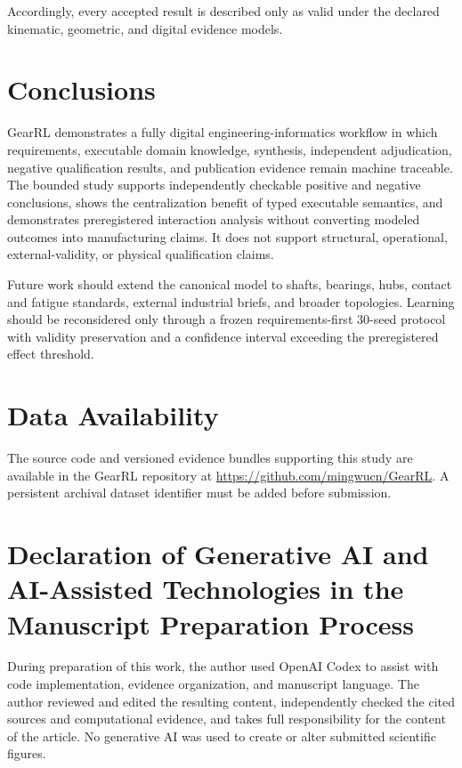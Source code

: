 \documentclass[preprint,12pt]{elsarticle}
\begin{document}
Accordingly, every accepted result is described only as valid under the declared kinematic, geometric, and digital evidence models.

\section{Conclusions}
GearRL demonstrates a fully digital engineering-informatics workflow in which requirements, executable domain knowledge, synthesis, independent adjudication, negative qualification results, and publication evidence remain machine traceable. The bounded study supports independently checkable positive and negative conclusions, shows the centralization benefit of typed executable semantics, and demonstrates preregistered interaction analysis without converting modeled outcomes into manufacturing claims. It does not support structural, operational, external-validity, or physical qualification claims.

Future work should extend the canonical model to shafts, bearings, hubs, contact and fatigue standards, external industrial briefs, and broader topologies. Learning should be reconsidered only through a frozen requirements-first 30-seed protocol with validity preservation and a confidence interval exceeding the preregistered effect threshold.

\section{Data Availability}
The source code and versioned evidence bundles supporting this study are available in the GearRL repository at \url{https://github.com/mingwucn/GearRL}. A persistent archival dataset identifier must be added before submission.

\section{Declaration of Generative AI and AI-Assisted Technologies in the Manuscript Preparation Process}
During preparation of this work, the author used OpenAI Codex to assist with code implementation, evidence organization, and manuscript language. The author reviewed and edited the resulting content, independently checked the cited sources and computational evidence, and takes full responsibility for the content of the article. No generative AI was used to create or alter submitted scientific figures.
\end{document}
